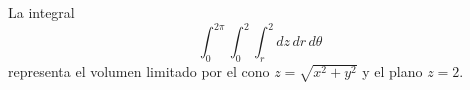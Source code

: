 \item La integral
\[ \int_0^{2\pi} \int_0^2 \int_r^2 dz \, dr \, d\theta \]
representa el volumen limitado por el cono $z = \sqrt{x^2 + y^2}$ y el plano $z = 2$.
